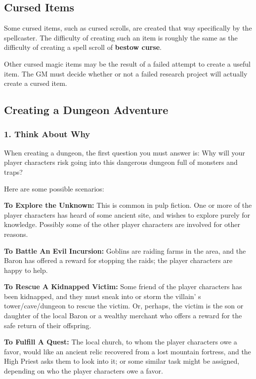 \documentclass[a4paper,twoside,openany,10pt]{book}
\begin{document}
\begin{multicols}{2}
\subsection{Cursed Items}\label{cursed-items}

Some cursed items, such as cursed scrolls, are created that way specifically by the spellcaster. The difficulty of creating such an item is roughly the same as the difficulty of creating a spell scroll of \textbf{bestow curse}.

Other cursed magic items may be the result of a failed attempt to create a useful item. The GM must decide whether or not a failed research project will actually create a cursed item.


\subsection{Creating a Dungeon Adventure}\label{creating-a-dungeon-adventure}

\subsubsection{1. Think About Why}\label{think-about-why}

When creating a dungeon, the first question you must answer is: Why will your player characters risk going into this dangerous dungeon full of monsters and traps?

Here are some possible scenarios:

\textbf{To Explore the Unknown:} This is common in pulp fiction. One or more of the player characters has heard of some ancient site, and wishes to explore purely for knowledge. Possibly some of the other player characters are involved for other reasons.

\textbf{To Battle An Evil Incursion:} Goblins are raiding farms in the area, and the Baron has offered a reward for stopping the raids; the player characters are happy to help.

\textbf{To Rescue A Kidnapped Victim:} Some friend of the player characters has been kidnapped, and they must sneak into or storm the villain' s tower/cave/dungeon to rescue the victim. Or, perhaps, the victim is the son or daughter of the local Baron or a wealthy merchant who offers a reward for the safe return of their offspring.

\textbf{To Fulfill A Quest:} The local church, to whom the player characters owe a favor, would like an ancient relic recovered from a lost mountain fortress, and the High Priest asks them to look into it; or some similar task might be assigned, depending on who the player characters owe a favor.


\end{multicols}
\end{document}
